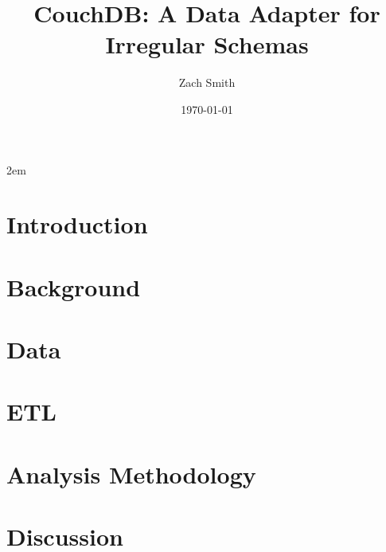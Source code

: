 \documentclass[
    a4paper,
    12pt
]{extreport}
\title{CouchDB: A Data Adapter for Irregular Schemas}
\author{Zach Smith}
\date{\today}
\begin{document}
\emergencystretch 2em

\maketitle
\thispagestyle{empty}

\begin{abstract}
    
\end{abstract}
\newpage

\tableofcontents
\newpage
\listoffigures
\newpage
\listoftables
\newpage

\chapter{Introduction}


\chapter{Background}






\chapter{Data}
\label{chapter:data}


\chapter{ETL}





\chapter{Analysis Methodology}









\chapter{Discussion}



\end{document}
